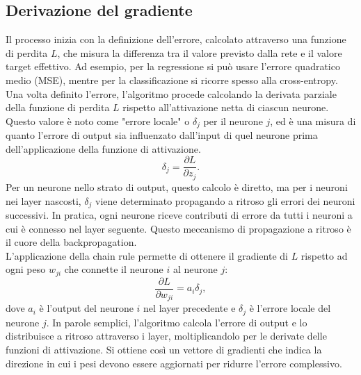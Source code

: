 \documentclass[a4paper,12pt]{report}
\begin{document}
	\subsection{Derivazione del gradiente}
	Il processo inizia con la definizione dell'errore, calcolato attraverso una funzione di perdita $L$, che misura la differenza tra il valore previsto dalla rete e il valore target effettivo. Ad esempio, per la regressione si può usare l'errore quadratico medio (MSE), mentre per la classificazione si ricorre spesso alla cross-entropy. \\
	Una volta definito l'errore, l'algoritmo procede calcolando la derivata parziale della funzione di perdita $L$ rispetto all'attivazione netta di ciascun neurone. Questo valore è noto come "errore locale" o $\delta_j$ per il neurone $j$, ed è una misura di quanto l'errore di output sia influenzato dall'input di quel neurone prima dell'applicazione della funzione di attivazione.
	\[
	\delta_j = \frac{\partial L}{\partial z_j}.
	\]
	Per un neurone nello strato di output, questo calcolo è diretto, ma per i neuroni nei layer nascosti, $\delta_j$ viene determinato propagando a ritroso gli errori dei neuroni successivi. In pratica, ogni neurone riceve contributi di errore da tutti i neuroni a cui è connesso nel layer seguente. Questo meccanismo di propagazione a ritroso è il cuore della backpropagation. \\
	L'applicazione della chain rule permette di ottenere il gradiente di $L$ rispetto ad ogni peso $w_{ji}$ che connette il neurone $i$ al neurone $j$:
	\[
	\frac{\partial L}{\partial w_{ji}} = a_i \delta_j,
	\]
	dove $a_i$ è l'output del neurone $i$ nel layer precedente e $\delta_j$ è l'errore locale del neurone $j$. In parole semplici, l'algoritmo calcola l'errore di output e lo distribuisce a ritroso attraverso i layer, moltiplicandolo per le derivate delle funzioni di attivazione. Si ottiene così un vettore di gradienti che indica la direzione in cui i pesi devono essere aggiornati per ridurre l'errore complessivo.
	
\end{document}
